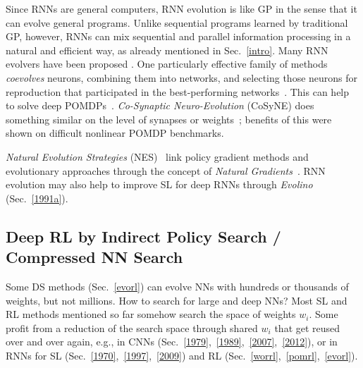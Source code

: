 \documentclass[letterpaper]{article}
\begin{document}
\begin{CJK*}{UTF8}{gbsn}
Since RNNs are general computers, 
RNN evolution is like GP in the sense that it can evolve general programs.
Unlike sequential programs learned by traditional GP, however, RNNs can mix sequential and parallel information processing in a natural and efficient way, as already 
mentioned in Sec.~\ref{intro}. Many RNN evolvers have been proposed \citep[e.g.,][]{miller:icga89,wieland1991,cliff1993,yao:review93,nolfi:alife4,Sims:1994:EVC,yamauchi94sequential,miglino95evolving,moriarty:phd,pasemann99,juang2004,whiteson2012}.
One particularly effective  family of methods {\em coevolves} neurons, combining them into networks, and
selecting those neurons for reproduction that participated in the best-performing
networks~\citep{moriarty:ml96,gomez:phd,Gomez:03}. This
can help to solve deep POMDPs~\citep{Gomez:05gecco}.
{\em Co-Synaptic Neuro-Evolution} (CoSyNE) does something similar on the level of synapses or weights~\citep{Gomez:08jmlr};
benefits of this were shown on difficult nonlinear POMDP benchmarks.

{\em Natural Evolution Strategies} (NES)~\citep{wierstraCEC08,glasmachers:2010b,Sun2009a,sun:gecco13} link policy
gradient methods and evolutionary approaches through the concept of {\em Natural Gradients}~\citep{amari1998natural}.
RNN evolution may also help to improve SL for deep RNNs 
through {\em Evolino}~\citep{Schmidhuber:07nc} (Sec.~\ref{1991a}).


\subsection{Deep RL by Indirect Policy Search / Compressed NN Search}
\label{comrl}

Some DS methods (Sec.~\ref{evorl}) can evolve NNs  
with hundreds or thousands of weights, but not millions. 
How to search for large and deep NNs? 
Most SL and RL methods mentioned so far somehow search the space of weights $w_i$. 
Some profit from a reduction of the search space through shared $w_i$ 
that get reused over and over again, e.g., in CNNs (Sec.~\ref{1979},~\ref{1989},~\ref{2007},~\ref{2012}),
or in RNNs for SL (Sec.~\ref{1970},~\ref{1997},~\ref{2009}) and RL (Sec.~\ref{worrl},~\ref{pomrl},~\ref{evorl}).


\end{CJK*}
\end{document}

